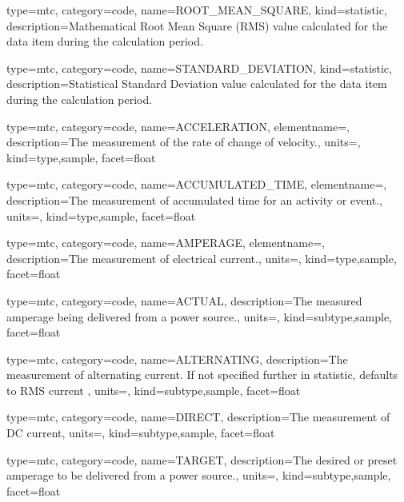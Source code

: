 {
  type=mtc,
  category=code,
  name={ROOT\_MEAN\_SQUARE},
  kind={statistic},
  description={Mathematical Root Mean Square (RMS) value calculated for the data item during the calculation period.}
}


{
  type=mtc,
  category=code,
  name={STANDARD\_DEVIATION},
  kind={statistic},
  description={Statistical Standard Deviation value calculated for the data item during the calculation period.}
}


{
  type=mtc,
  category=code,
  name={ACCELERATION},
  elementname=,
  description={The measurement of the rate of change of velocity.},
  units=,
  kind={type,sample},
  facet={\gls{float}}
}


{
  type=mtc,
  category=code,
  name={ACCUMULATED\_TIME},
  elementname=,
  description={The measurement of accumulated time for an activity or event.},
  units=,
  kind={type,sample},
  facet={\gls{float}}
}


{
  type=mtc,
  category=code,
  name={AMPERAGE},
  elementname=,
  description={The measurement of electrical current.},
  units=,
  kind={type,sample},
  facet={\gls{float}}
}


{
  type=mtc,
  category=code,
  name={ACTUAL},
  description={The measured amperage being delivered from a power source.},
  units=,
  kind={subtype,sample},
  facet={\gls{float}}
}


{
  type=mtc,
  category=code,
  name={ALTERNATING},
  description={The measurement of alternating current.   If not specified further in statistic, defaults to RMS current  },
  units=,
  kind={subtype,sample},
  facet={\gls{float}}
}


{
  type=mtc,
  category=code,
  name={DIRECT},
  description={The measurement of DC current},
  units=,
  kind={subtype,sample},
  facet={\gls{float}}
}


{
  type=mtc,
  category=code,
  name={TARGET},
  description={The desired or preset amperage to be delivered from a power source.},
  units=,
  kind={subtype,sample},
  facet={\gls{float}}
}


